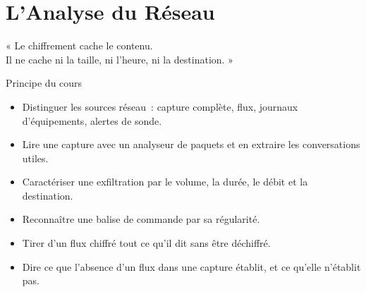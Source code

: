 
\chapter{L'Analyse du Réseau}
\label{chap:reseau}

\epigraph{%
    « Le chiffrement cache le contenu.\\
    Il ne cache ni la taille, ni l'heure, ni la destination. »%
}{Principe du cours}


\begin{boxobjectifs}
\begin{itemize}
    \item Distinguer les sources réseau~: capture complète, flux, journaux
          d'équipements, alertes de sonde.
    \item Lire une capture avec un analyseur de paquets et en extraire les
          conversations utiles.
    \item Caractériser une exfiltration par le volume, la durée, le débit
          et la destination.
    \item Reconnaître une balise de commande par sa régularité.
    \item Tirer d'un flux chiffré tout ce qu'il dit sans être déchiffré.
    \item Dire ce que l'absence d'un flux dans une capture établit, et ce
          qu'elle n'établit pas.
\end{itemize}
\end{boxobjectifs}

